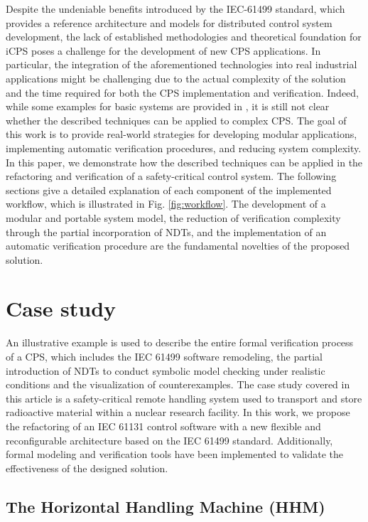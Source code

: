 \documentclass{ieeeojies}
\begin{document}
Despite the undeniable benefits introduced by the IEC-61499 standard, which provides a reference architecture and models for distributed control system development, the lack of established methodologies and theoretical foundation for iCPS poses a challenge for the development of new CPS applications. 
In particular, the integration of the aforementioned technologies into real industrial applications might be challenging due to the actual complexity of the solution and the time required for both the CPS implementation and verification. 
Indeed, while some examples for basic systems are provided in \cite{xavier2021}, it is still not clear whether the described techniques can be applied to complex CPS. 
The goal of this work is to provide real-world strategies for developing modular applications, implementing automatic verification procedures, and reducing system complexity. In this paper, we demonstrate how the described techniques can be applied in the refactoring and verification of a safety-critical control system.
The following sections give a detailed explanation of each component of the implemented workflow, which is illustrated in Fig. \ref{fig:workflow}.
The development of a modular and portable system model, the reduction of verification complexity through the partial incorporation of NDTs, and the implementation of an automatic verification procedure are the fundamental novelties of the proposed solution.

\section{Case study}
\label{sec:case_study}
An illustrative example is used to describe the entire formal verification process of a CPS, which includes the IEC 61499 software remodeling, the partial introduction of NDTs to conduct symbolic model checking under realistic conditions and the visualization of counterexamples.
The case study covered in this article is a safety-critical remote handling system used to transport and store radioactive material within a nuclear research facility. 
In this work, we propose the refactoring of an IEC 61131 control software with a new flexible and reconfigurable architecture based on the IEC 61499 standard. Additionally, formal modeling and verification tools have been implemented to validate the effectiveness of the designed solution.

\subsection{The Horizontal Handling Machine (HHM)}
\end{document}
